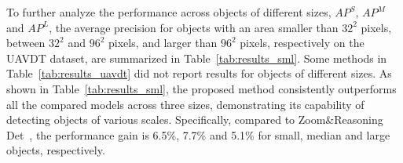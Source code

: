 \documentclass[letterpaper]{article} %
\begin{document}
To further analyze the performance across objects of different sizes, $AP^S$, $AP^M$ and $AP^L$, the average precision for objects with an area smaller than $32^2$ pixels, between $32^2$ and $96^2$ pixels, and larger than $96^2$ pixels, respectively on the UAVDT dataset, are summarized in Table~\ref{tab:results_sml}. %
Some methods in Table~\ref{tab:results_uavdt} did not %
report results for objects of different sizes. As shown in Table~\ref{tab:results_sml}, the proposed method consistently outperforms all the compared models across three sizes, demonstrating its capability of detecting objects of various scales. Specifically, compared %
to Zoom\&Reasoning Det~\cite{Ge_2022_ZoomAndReasoning}, 
the performance gain is 6.5\%, 7.7\% and 5.1\% for small, median and large objects, respectively. %
\begin{table}[!t]
 \centering
 \caption{Comparison with state-of-the-art methods on the UAVDT dataset in terms of $AP^S$, $AP^M$ and $AP^L$.}
 \label{tab:results_sml}
\end{table}
\end{document}
